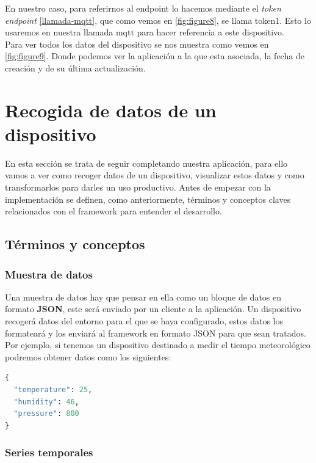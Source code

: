 {En nuestro caso, para referirnos al endpoint lo hacemos mediante el \textit{token endpoint} \ref{llamada-mqtt}, que como vemos en \ref{fig:figure8}, se llama token1. Esto lo usaremos en nuestra llamada mqtt para hacer referencia a este dispositivo.\\

Para ver todos los datos del dispositivo se nos muestra como vemos en \ref{fig:figure9}. Donde podemos ver la aplicación a la que esta asociada, la fecha de creación y de su última actualización.

\newpage


\section{Recogida de datos de un dispositivo}

En esta sección se trata de seguir completando nuestra aplicación, para ello vamos a ver como recoger datos de un dispositivo, visualizar estos datos y como transformarlos para darles un uso productivo. Antes de empezar con la implementación se definen, como anteriormente, términos y conceptos claves relacionados con el framework para entender el desarrollo. \cite{kaaiotCollectData}

\subsection{Términos y conceptos}

\subsubsection{Muestra de datos}

Una muestra de datos hay que pensar en ella como un bloque de datos en formato \textbf{JSON}, este será enviado por un cliente a la aplicación. Un dispositivo recogerá datos del entorno para el que se haya configurado, estos datos los formateará y los enviará al framework en formato JSON para que sean tratados. Por ejemplo, si tenemos un dispositivo destinado a medir el tiempo meteorológico podremos obtener datos como los siguientes:

\begin{lstlisting}[language=Python]
{
  "temperature": 25,
  "humidity": 46,
  "pressure": 800
}
\end{lstlisting}

\subsubsection{Series temporales}

}
